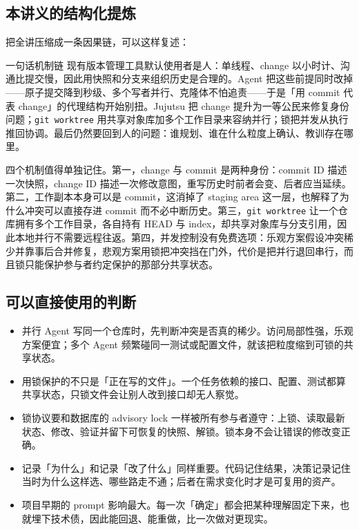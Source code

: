 \documentclass[a4paper]{article}
\begin{document}
\subsection{本讲义的结构化提炼}

把全讲压缩成一条因果链，可以这样复述：

\begin{importantbox}{一句话机制链}
现有版本管理工具默认使用者是人：单线程、change 以小时计、沟通比提交慢，因此用快照和分支来组织历史是合理的。Agent 把这些前提同时改掉——原子提交降到秒级、多个写者并行、克隆体不怕追责——于是「用 commit 代表 change」的代理结构开始别扭。Jujutsu 把 change 提升为一等公民来修复身份问题；\texttt{git worktree} 用共享对象库加多个工作目录来容纳并行；锁把并发从执行推回协调。最后仍然要回到人的问题：谁规划、谁在什么粒度上确认、教训存在哪里。
\end{importantbox}

四个机制值得单独记住。第一，change 与 commit 是两种身份：commit ID 描述一次快照，change ID 描述一次修改意图，重写历史时前者会变、后者应当延续。第二，工作副本本身可以是 commit，这消掉了 staging area 这一层，也解释了为什么冲突可以直接存进 commit 而不必中断历史。第三，\texttt{git worktree} 让一个仓库拥有多个工作目录，各自持有 HEAD 与 index，却共享对象库与分支引用，因此本地并行不需要远程往返。第四，并发控制没有免费选项：乐观方案假设冲突稀少并靠事后合并修复，悲观方案用锁把冲突挡在门外，代价是把并行退回串行，而且锁只能保护参与者约定保护的那部分共享状态。

\subsection{可以直接使用的判断}

\begin{itemize}
  \item 并行 Agent 写同一个仓库时，先判断冲突是否真的稀少。访问局部性强，乐观方案便宜；多个 Agent 频繁碰同一测试或配置文件，就该把粒度缩到可锁的共享状态。
  \item 用锁保护的不只是「正在写的文件」。一个任务依赖的接口、配置、测试都算共享状态，只锁文件会让别人改到接口却无人察觉。
  \item 锁协议要和数据库的 advisory lock 一样被所有参与者遵守：上锁、读取最新状态、修改、验证并留下可恢复的快照、解锁。锁本身不会让错误的修改变正确。
  \item 记录「为什么」和记录「改了什么」同样重要。代码记住结果，决策记录记住当时为什么这样选、哪些路走不通；后者在需求变化时才是可复用的资产。
  \item 项目早期的 prompt 影响最大。每一次「确定」都会把某种理解固定下来，也就埋下技术债，因此能回退、能重做，比一次做对更现实。
\end{itemize}
\end{document}

